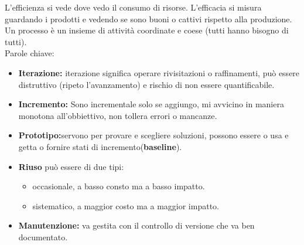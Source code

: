 L'efficienza si vede dove vedo il consumo di risorse. L'efficacia si misura guardando i prodotti e vedendo se sono buoni o cattivi rispetto alla produzione. Un processo è un insieme di attività coordinate e coese (tutti hanno bisogno di tutti).\\
Parole chiave:
\begin{itemize}
	\item\textbf{Iterazione:} iterazione significa operare rivisitazioni o raffinamenti, può essere distruttivo (ripeto l'avanzamento) e rischio di non essere quantificabile.
	\item\textbf{Incremento:} Sono incrementale solo se aggiungo, mi avvicino in maniera monotona all'obbiettivo, non tollera errori o mancanze.
	\item\textbf{Prototipo:}servono per provare e scegliere soluzioni, possono essere o usa e getta o fornire stati di incremento(\textbf{baseline}).
	\item\textbf{Riuso} può essere di due tipi:
	\begin{itemize}
	
		\item occasionale, a basso consto ma a basso impatto.
		\item sistematico, a maggior costo ma a maggior impatto.
	\end{itemize}
	\item \textbf{Manutenzione:} va gestita con il controllo di versione che va ben documentato.
\end{itemize}


